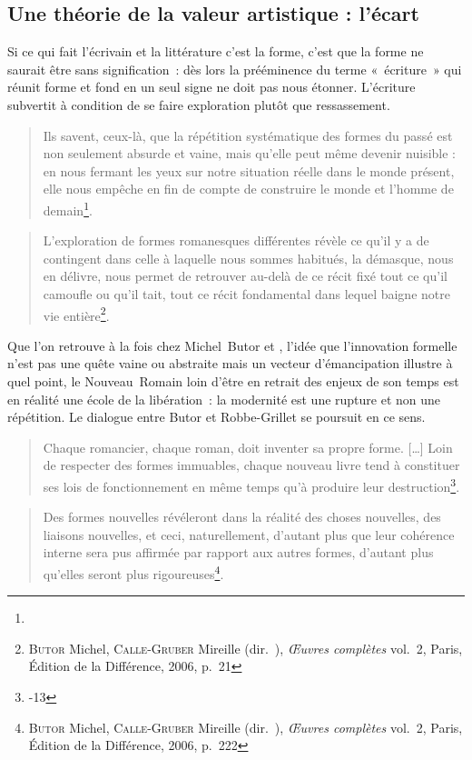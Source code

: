 \documentclass[12pt, a4paper]{article}
\begin{document}
\subsection{Une théorie de la valeur artistique : l'écart}
\label{theorie}
Si ce qui fait l'écrivain et la littérature c'est la forme, c'est que la forme ne saurait être sans signification~: dès lors la prééminence du terme «~écriture~» qui réunit forme et fond en un seul signe ne doit pas nous étonner. L'écriture subvertit à condition de se faire exploration plutôt que ressassement. 
\begin{quote}
    Ils savent, ceux-là, que la répétition systématique des formes du passé est non seulement absurde et vaine, mais qu’elle peut même devenir nuisible : en nous fermant les yeux sur notre situation réelle dans le monde présent, elle nous empêche en fin de compte de construire le monde et l’homme de demain\footnote{}.
\end{quote}
\begin{quote}
	L’exploration de formes romanesques différentes révèle ce qu’il y a de contingent dans celle à laquelle nous sommes habitués, la démasque, nous en délivre, nous permet de retrouver au-delà de ce récit fixé tout ce qu’il camoufle ou qu’il tait, tout ce récit fondamental dans lequel baigne notre vie entière\footnote{\textsc{Butor} Michel, \textsc{Calle-Gruber} Mireille (dir.~), \textit{Œuvres complètes} vol.~2, Paris, Édition de la Différence, 2006, p.~21}.
\end{quote}
Que l'on retrouve à la fois chez Michel~Butor et \robbe, l'idée que l'innovation formelle n'est pas une quête vaine ou abstraite mais un vecteur d'émancipation illustre à quel point, le Nouveau~Romain loin d'être en retrait des enjeux de son temps est en réalité une école de la libération~: la modernité est une rupture et non une répétition. Le dialogue entre Butor et Robbe-Grillet se poursuit en ce sens.
\begin{quote}
    Chaque romancier, chaque roman, doit inventer sa propre forme. […] Loin de respecter des formes immuables, chaque nouveau livre tend à constituer ses lois de fonctionnement en même temps qu'à produire leur destruction\footnote{-13}.
\end{quote}
\begin{quote}
    Des formes nouvelles révéleront dans la réalité des choses nouvelles, des liaisons nouvelles, et ceci, naturellement, d’autant plus que leur cohérence interne sera pus affirmée par rapport aux autres formes, d’autant plus qu’elles seront plus rigoureuses\footnote{\textsc{Butor} Michel, \textsc{Calle-Gruber} Mireille (dir.~), \textit{Œuvres complètes} vol.~2, Paris, Édition de la Différence, 2006, p.~222}.         
\end{quote}
\end{document}
